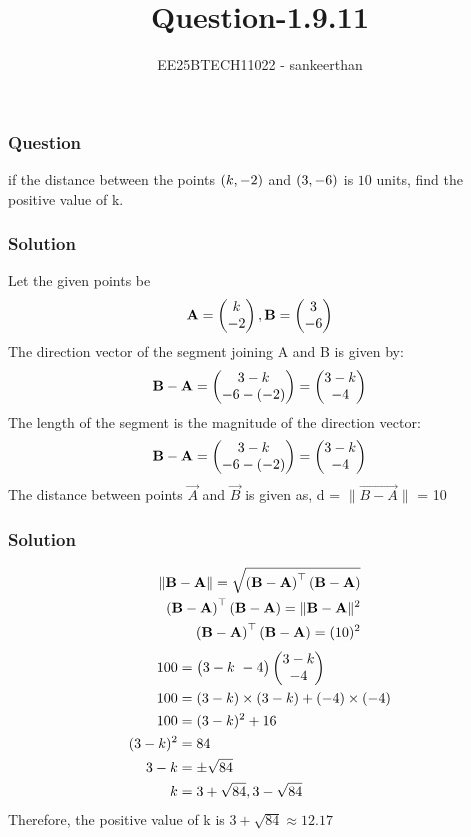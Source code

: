 \documentclass{beamer}
\title{Question-1.9.11}
\author{EE25BTECH11022 - sankeerthan}
\date{}
\begin{document}
\frame{\titlepage}

\begin{frame}
\frametitle{Question}
if the distance between the points $\left(k,-2\right)$ and $\left(3,-6\right)$ is $10$ units, find the positive value of k.
\end{frame}

\begin{frame}
\frametitle{Solution}
Let the given points be
 \begin{align}
 \mathbf{A} = \begin{pmatrix}k \\ -2\end{pmatrix}, \mathbf{B} = \begin{pmatrix}3 \\ -6\end{pmatrix} 
 \end{align}
The direction vector of the segment joining A and B is given by:
\begin{align}
\mathbf{B} - \mathbf{A} = \begin{pmatrix}3 - k \\ -6 -(-2)\end{pmatrix} = \begin{pmatrix}3-k \\ -4\end{pmatrix} 
\end{align}
The length of the segment is the magnitude of the direction vector:
 \begin{align}
\mathbf{B} - \mathbf{A} = \begin{pmatrix}3 - k \\ -6 -(-2)\end{pmatrix} = \begin{pmatrix}3-k \\ -4\end{pmatrix} 
\end{align}
The distance between points $\vec{A}$ and $\vec{B}$ is given as,
d = $\|\vec{B-A}\|$ = 10
\end{frame}

\begin{frame}
\frametitle{Solution}\begin{align}
\|\mathbf{B-A}\| = \sqrt{\left(\mathbf{B}-\mathbf{A}\right)^\top \left(\mathbf{B}-\mathbf{A}\right)}  \\
\left(\mathbf{B}-\mathbf{A}\right)^\top \left(\mathbf{B}-\mathbf{A}\right) = \|\mathbf{B-A}\|^2 \\
\left(\mathbf{B}-\mathbf{A}\right)^\top \left(\mathbf{B}-\mathbf{A}\right) = (10)^2
\end{align}
\begin{align}
100 &=\begin{pmatrix}3-k  \ -4\end{pmatrix}\begin{pmatrix}3-k \\ -4\end{pmatrix}\\
100 &=(3-k)\times(3-k)+(-4)\times(-4) \\
100 &=(3-k)^2 + 16 \\
(3-k)^2 &= 84 \\
3-k &=\pm \sqrt{84} \\
k &= 3+\sqrt{84} ,3-\sqrt{84}
\end{align}
Therefore, the positive value of k is $3+\sqrt{84} \approx 12.17$

\end{frame}
\end{document}
